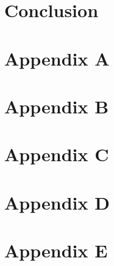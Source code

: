 \documentclass[%
	paper=A4,					%
	twoside=true,				%
	openright,					%
	chapterprefix=true,			%
	11pt,						%
	headings=normal,			%
	bibliography=totoc,			%
	listof=totoc,				%
	titlepage=on,				%
	captions=tableabove,		%
	draft=false,				%
]{scrreprt}
\begin{document}
\chapter{Conclusion}
\label{sec:conclusion}

%
\begin{appendices}
\chapter{Appendix A}

\chapter{Appendix B}

\chapter{Appendix C}
	
\chapter{Appendix D}

\chapter{Appendix E}

\end{appendices} 

\cleardoublepage
{%
\renewcommand{\bibfont}{\normalfont\small}
\setlength{\biblabelsep}{0pt}
\setlength{\bibitemsep}{0.5\baselineskip plus 0.5\baselineskip}
\printbibliography} 
\end{document}
